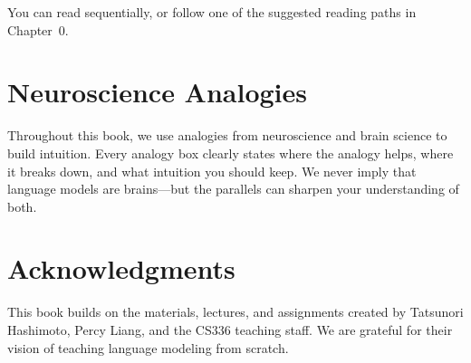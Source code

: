 You can read sequentially, or follow one of the suggested reading paths in Chapter~0.

\section*{Neuroscience Analogies}

Throughout this book, we use analogies from neuroscience and brain science to build intuition. Every analogy box clearly states where the analogy helps, where it breaks down, and what intuition you should keep. We never imply that language models are brains---but the parallels can sharpen your understanding of both.

\section*{Acknowledgments}

This book builds on the materials, lectures, and assignments created by Tatsunori Hashimoto, Percy Liang, and the CS336 teaching staff. We are grateful for their vision of teaching language modeling from scratch.
